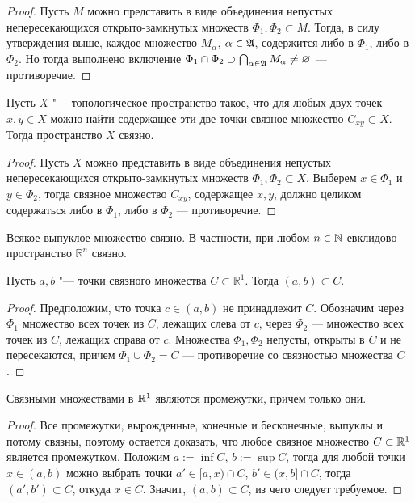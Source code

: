\begin{proof}
	Пусть $M$ можно представить в виде объединения непустых непересекающихся открыто-замкнутых множеств $\Phi_1, \Phi_2 \subset M$. Тогда, в силу утверждения выше, каждое множество $M_{\alpha}$, $\alpha \in \mathfrak A$, содержится либо в $\Phi_1$, либо в $\Phi_2$. Но тогда выполнено включение $\Phi_1 \cap \Phi_2 \supset \bigcap_{\alpha \in \mathfrak A}M_\alpha \ne \varnothing$ --- противоречие.
\end{proof}

\begin{theorem} \label{theorempathconnected}
	Пусть $X$ "--- топологическое пространство такое, что для любых двух точек $x, y \in X$ можно найти содержащее эти две точки связное множество $C_{xy} \subset X$. Тогда пространство $X$ связно.
\end{theorem}

\begin{proof}
	Пусть $X$ можно представить в виде объединения непустых непересекающихся открыто-замкнутых множеств $\Phi_1, \Phi_2 \subset X$. Выберем $x \in \Phi_1$ и $y \in \Phi_2$, тогда связное множество $C_{xy}$, содержащее $x, y$, должно целиком содержаться либо в $\Phi_1$, либо в $\Phi_2$ --- противоречие.
\end{proof}

\begin{corollary}
	Всякое выпуклое множество связно. В частности, при любом $n \in \mathbb{N}$ евклидово пространство $\mathbb R^n$ связно.
\end{corollary}

\begin{proposition}
	Пусть $a, b$ "--- точки связного множества $C \subset \mathbb{R}^1$. Тогда $(a, b) \subset C$.
\end{proposition}

\begin{proof}
	Предположим, что точка $c \in (a, b)$ не принадлежит $C$. Обозначим через $\Phi_1$ множество всех точек из $C$, лежащих слева от $c$, через $\Phi_2$ --- множество всех точек из $C$, лежащих справа от $c$. Множества $\Phi_1, \Phi_2$ непусты, открыты в $C$ и не пересекаются, причем $\Phi_1 \cup \Phi_2 = C$ --- противоречие со связностью множества $C$.
\end{proof}

\begin{theorem}
	Связными множествами в $\mathbb{R}^1$ являются промежутки, причем только они.
\end{theorem}

\begin{proof}
	Все промежутки, вырожденные, конечные и бесконечные, выпуклы и потому связны, поэтому остается доказать, что любое связное множество $C \subset \mathbb{R}^1$ является промежутком. Положим $a := \inf C$, $b := \sup C$, тогда для любой точки $x \in (a, b)$ можно выбрать точки $a' \in [a, x) \cap C$, $b' \in (x, b] \cap C$, тогда $(a', b') \subset C$, откуда $x \in C$. Значит, $(a, b) \subset C$, из чего следует требуемое.
\end{proof}

